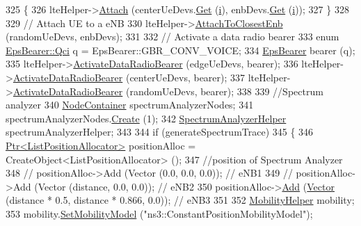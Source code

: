 \begin{DoxyCode}
325     \{
326       lteHelper->\hyperlink{classns3_1_1LteHelper_a9466743f826aa2652a87907b7f0a1c87}{Attach} (centerUeDevs.\hyperlink{classns3_1_1NetDeviceContainer_a677d62594b5c9d2dea155cc5045f4d0b}{Get} (\hyperlink{bernuolliDistribution_8m_a6f6ccfcf58b31cb6412107d9d5281426}{i}), enbDevs.\hyperlink{classns3_1_1NetDeviceContainer_a677d62594b5c9d2dea155cc5045f4d0b}{Get} (\hyperlink{bernuolliDistribution_8m_a6f6ccfcf58b31cb6412107d9d5281426}{i}));
327     \}
328 
329   \textcolor{comment}{// Attach UE to a eNB}
330   lteHelper->\hyperlink{classns3_1_1LteHelper_af1e68c53f22b705f1c41753558240999}{AttachToClosestEnb} (randomUeDevs, enbDevs);
331 
332   \textcolor{comment}{// Activate a data radio bearer}
333   \textcolor{keyword}{enum} \hyperlink{structns3_1_1EpsBearer_aecf0c67109c5eb4ec0b07226fff5885e}{EpsBearer::Qci} q = EpsBearer::GBR\_CONV\_VOICE;
334   \hyperlink{structns3_1_1EpsBearer}{EpsBearer} bearer (q);
335   lteHelper->\hyperlink{classns3_1_1LteHelper_ac896e16cf162e4beeaa292d39ab1b700}{ActivateDataRadioBearer} (edgeUeDevs, bearer);
336   lteHelper->\hyperlink{classns3_1_1LteHelper_ac896e16cf162e4beeaa292d39ab1b700}{ActivateDataRadioBearer} (centerUeDevs, bearer);
337   lteHelper->\hyperlink{classns3_1_1LteHelper_ac896e16cf162e4beeaa292d39ab1b700}{ActivateDataRadioBearer} (randomUeDevs, bearer);
338 
339   \textcolor{comment}{//Spectrum analyzer}
340   \hyperlink{classns3_1_1NodeContainer}{NodeContainer} spectrumAnalyzerNodes;
341   spectrumAnalyzerNodes.\hyperlink{classns3_1_1NodeContainer_a787f059e2813e8b951cc6914d11dfe69}{Create} (1);
342   \hyperlink{classns3_1_1SpectrumAnalyzerHelper}{SpectrumAnalyzerHelper} spectrumAnalyzerHelper;
343 
344   \textcolor{keywordflow}{if} (generateSpectrumTrace)
345     \{
346       \hyperlink{classns3_1_1Ptr}{Ptr<ListPositionAllocator>} positionAlloc = 
      CreateObject<ListPositionAllocator> ();
347       \textcolor{comment}{//position of Spectrum Analyzer}
348 \textcolor{comment}{//        positionAlloc->Add (Vector (0.0, 0.0, 0.0));                              // eNB1}
349 \textcolor{comment}{//        positionAlloc->Add (Vector (distance,  0.0, 0.0));                        // eNB2}
350       positionAlloc->\hyperlink{classns3_1_1ListPositionAllocator_a460e82f015ac012a73ba0ea0cccb3486}{Add} (\hyperlink{classns3_1_1Vector3D_a7e59b47bc94c9cb1dadff68c1d0112d8}{Vector} (distance * 0.5, distance * 0.866, 0.0));          \textcolor{comment}{// eNB3}
351 
352       \hyperlink{classns3_1_1MobilityHelper}{MobilityHelper} mobility;
353       mobility.\hyperlink{classns3_1_1MobilityHelper_a030275011b6f40682e70534d30280aba}{SetMobilityModel} (\textcolor{stringliteral}{"ns3::ConstantPositionMobilityModel"});

\end{DoxyCode}
